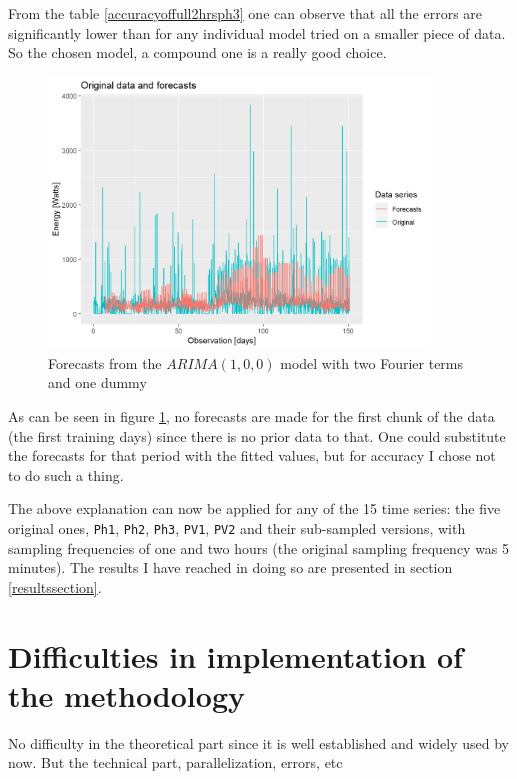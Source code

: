\documentclass[12pt,a4paper,titlepage]{report}
\begin{document}
From the table \ref{accuracyoffull2hrsph3} one can observe that all the errors are significantly lower than for any individual model tried on a smaller piece of data. So the chosen model, a compound one is a really good choice.
    
\begin{figure}[h]
    \centering
    \includegraphics[width=0.9\textwidth]{d2hrsph3fourierDummiesforecast}
    \caption{Forecasts from the $ ARIMA(1, 0, 0) $ model with two Fourier terms and one dummy}
    \label{d2hrsph3fourierDummiesforecast}
\end{figure}

As can be seen in figure \ref{d2hrsph3fourierDummiesforecast}, no forecasts are made for the first chunk of the data (the first training days) since there is no prior data to that. One could substitute the forecasts for that period with the fitted values, but for accuracy I chose not to do such a thing.

The above explanation can now be applied for any of the 15 time series: the five original ones, \texttt{Ph1}, \texttt{Ph2}, \texttt{Ph3}, \texttt{PV1}, \texttt{PV2} and their sub-sampled versions, with sampling frequencies of one and two hours (the original sampling frequency was 5 minutes). The results I have reached in doing so are presented in section \ref{resultssection}.

\section{Difficulties in implementation of the methodology}
No difficulty in the theoretical part since it is well established and widely used by now.
But the technical part, parallelization, errors, etc
\end{document}
